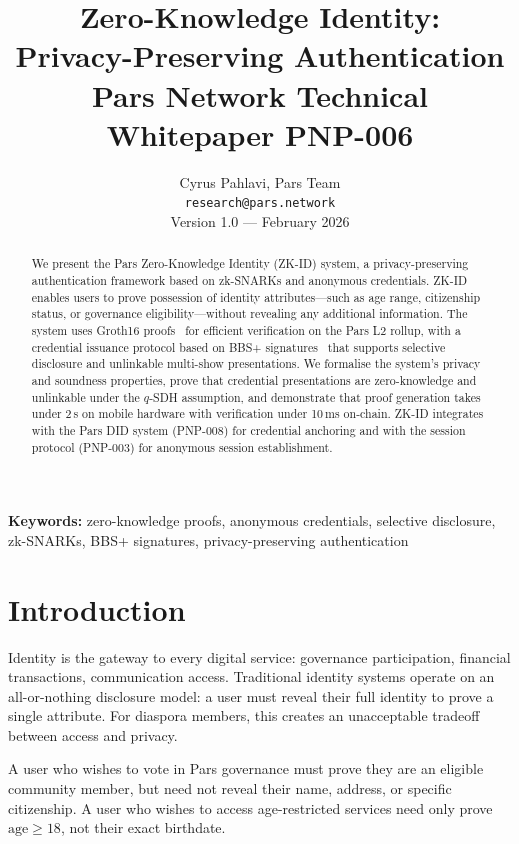 \documentclass[11pt,a4paper]{article}
\title{%
    \textbf{Zero-Knowledge Identity:\\
    Privacy-Preserving Authentication}\\[0.5em]
    \large Pars Network Technical Whitepaper PNP-006
}
\author{%
    Cyrus Pahlavi, Pars Team\\
    \texttt{research@pars.network}\\[0.5em]
    \small Version 1.0 --- February 2026
}
\date{}
\begin{document}
\parscoverpage

\thispagestyle{fancy}

\begin{abstract}
\noindent
We present the Pars Zero-Knowledge Identity (ZK-ID) system, a
privacy-preserving authentication framework based on zk-SNARKs and
anonymous credentials.  ZK-ID enables users to prove possession of
identity attributes---such as age range, citizenship status, or governance
eligibility---without revealing any additional information.  The system
uses Groth16 proofs~\cite{groth2016size} for efficient verification
on the Pars L2 rollup, with a credential issuance protocol based on
BBS+ signatures~\cite{au2006constant} that supports selective disclosure
and unlinkable multi-show presentations.  We formalise the system's
privacy and soundness properties, prove that credential presentations
are zero-knowledge and unlinkable under the $q$-SDH assumption, and
demonstrate that proof generation takes under 2\,s on mobile hardware
with verification under 10\,ms on-chain.  ZK-ID integrates with the
Pars DID system (PNP-008) for credential anchoring and with the session
protocol (PNP-003) for anonymous session establishment.
\end{abstract}

\vspace{1em}
\noindent\textbf{Keywords:} zero-knowledge proofs, anonymous credentials,
selective disclosure, zk-SNARKs, BBS+ signatures, privacy-preserving
authentication

\tableofcontents
\newpage

\section{Introduction}
\label{sec:introduction}

Identity is the gateway to every digital service: governance participation,
financial transactions, communication access.  Traditional identity systems
operate on an all-or-nothing disclosure model: a user must reveal their
full identity to prove a single attribute.  For diaspora members, this
creates an unacceptable tradeoff between access and privacy.

A user who wishes to vote in Pars governance must prove they are an
eligible community member, but need not reveal their name, address, or
specific citizenship.  A user who wishes to access age-restricted services
need only prove $\mathrm{age} \geq 18$, not their exact birthdate.
\end{document}
